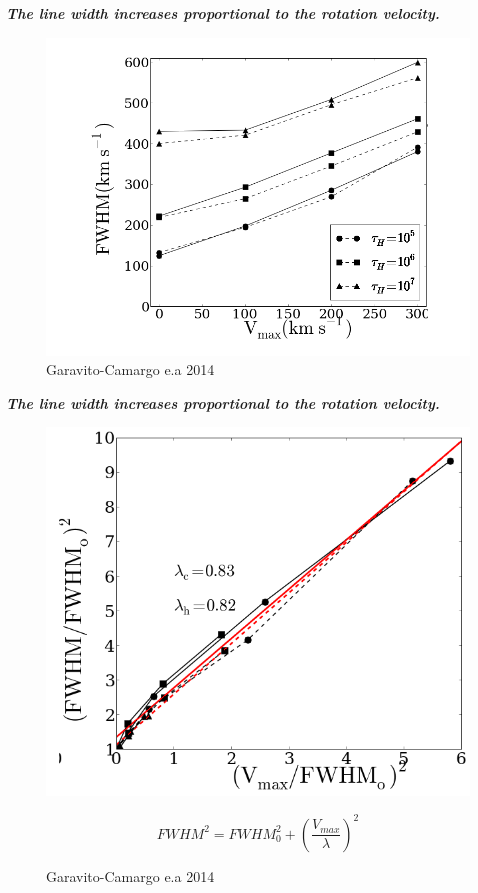 \documentclass{beamer}
\begin{document}


\begin{frame}{\textit{\textbf{The line width increases proportional to the rotation velocity.}}}
\begin{figure}
\includegraphics[scale=0.30]{Figures/f71.png}
\caption*{Garavito-Camargo e.a 2014}
\end{figure}
\end{frame}



\begin{frame}{\textit{\textbf{The line width increases proportional to the rotation velocity.}}}
\begin{figure}
\includegraphics[scale=0.25]{Figures/f72.png}
\caption*{Garavito-Camargo e.a 2014}
\[
FWHM^2 = FWHM_0 ^2 + \left (\dfrac{V_{max}}{\lambda}\right ) ^2
\]

\end{figure}
\end{frame}
\end{document}
